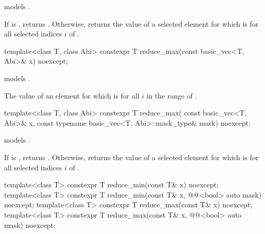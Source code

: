 \begin{itemdescr}
\pnum
\constraints
{} models .

\pnum
\returns
If  is , returns
.
Otherwise, returns the value of a selected element  for which
 is  for all selected indices $i$ of
.
\end{itemdescr}

\begin{itemdecl}
template<class T, class Abi> constexpr T reduce_max(const basic_vec<T, Abi>& x) noexcept;
\end{itemdecl}

\begin{itemdescr}
\pnum
\constraints
{} models .

\pnum
\returns
The value of an element  for which  is
 for all $i$ in the range of .
\end{itemdescr}

\begin{itemdecl}
template<class T, class Abi>
  constexpr T reduce_max(
    const basic_vec<T, Abi>& x, const typename basic_vec<T, Abi>::mask_type& mask) noexcept;
\end{itemdecl}

\begin{itemdescr}
\pnum
\constraints
{} models .

\pnum
\returns
If  is , returns
.
Otherwise, returns the value of a selected element  for which
 is  for all selected indices $i$ of
.
\end{itemdescr}

\begin{itemdecl}
template<class T> constexpr T reduce_min(const T& x) noexcept;
template<class T> constexpr T reduce_min(const T& x, @@<bool> auto mask) noexcept;
template<class T> constexpr T reduce_max(const T& x) noexcept;
template<class T> constexpr T reduce_max(const T& x, @@<bool> auto mask) noexcept;
\end{itemdecl}

